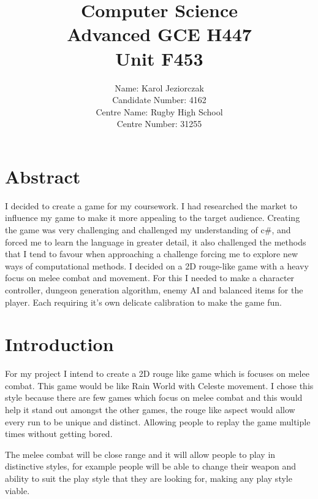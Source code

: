 \documentclass{article}
\newcommand{\parBr}{\vspace{5mm}}%
\begin{document}
\title{Computer Science \\ Advanced GCE H447 \\ Unit F453 \\[2\baselineskip]}
\author{\large Name: Karol Jeziorczak \\ Candidate Number: 4162 \\ Centre Name: Rugby High School \\ Centre Number: 31255 }
\date{}
\maketitle
\newpage
\tableofcontents
\newpage
\listoffigures
\newpage
\printbibliography
\newpage

\section{Abstract}
I decided to create a game for my coursework. I had researched the market to influence my game to make it more appealing to the target audience. Creating the game was very challenging and challenged my understanding of c\#, and forced me to learn the language in greater detail, it also challenged the methods that I tend to favour when approaching a challenge forcing me to explore new ways of computational methods. I decided on a 2D rouge-like game with a heavy focus on melee combat and movement. For this I needed to make a character controller, dungeon generation algorithm, enemy AI and balanced items for the player. Each requiring it's own delicate calibration to make the game fun. 

\section{Introduction}
For my project I intend to create a 2D rouge like game which is focuses on melee combat. This game would be like Rain World with Celeste movement. I chose this style because there are few games which focus on melee combat and this would help it stand out amongst the other games, the rouge like aspect would allow every run to be unique and distinct. Allowing people to replay the game multiple times without getting bored.

\parBr

The melee combat will be close range and it will allow people to play in distinctive styles, for example people will be able to change their weapon and ability to suit the play style that they are looking for, making any play style viable.
\end{document}
